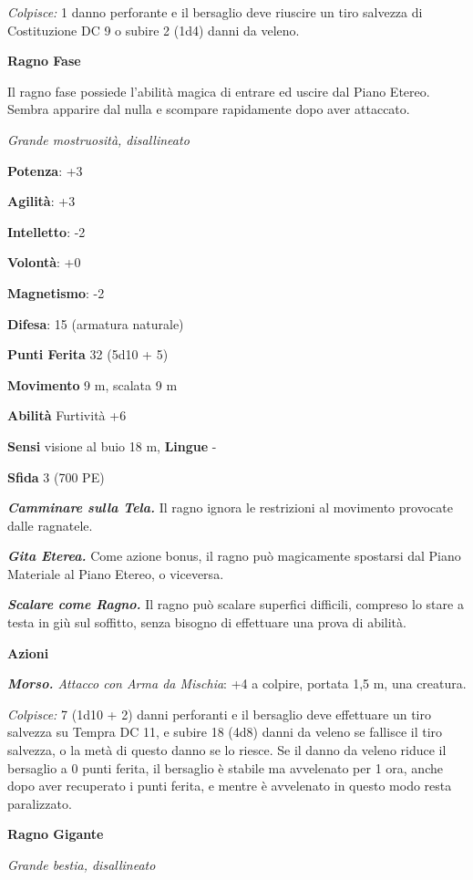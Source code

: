 \begin{multicols}{2}
\emph{Colpisce:} 1 danno perforante e il bersaglio deve riuscire un tiro
salvezza di Costituzione DC 9 o subire 2 (1d4) danni da veleno.



\textbf{Ragno Fase}

Il ragno fase possiede l'abilità magica di entrare ed uscire dal Piano
Etereo. Sembra apparire dal nulla e scompare rapidamente dopo aver
attaccato.

\emph{Grande mostruosità, disallineato}

\textbf{Potenza}: +3

\textbf{Agilità}: +3

\textbf{Intelletto}: -2

\textbf{Volontà}: +0

\textbf{Magnetismo}: -2

\textbf{Difesa}: 15 (armatura naturale)

\textbf{Punti Ferita} 32 (5d10 + 5)

\textbf{Movimento} 9 m, scalata 9 m

\textbf{Abilità} Furtività +6

\textbf{Sensi} visione al buio 18 m, 
\textbf{Lingue} -

\textbf{Sfida} 3 (700 PE)

\emph{\textbf{Camminare sulla Tela.}} Il ragno ignora le restrizioni al
movimento provocate dalle ragnatele.

\emph{\textbf{Gita Eterea.}} Come azione bonus, il ragno può magicamente
spostarsi dal Piano Materiale al Piano Etereo, o viceversa.

\emph{\textbf{Scalare come Ragno.}} Il ragno può scalare superfici
difficili, compreso lo stare a testa in giù sul soffitto, senza bisogno
di effettuare una prova di abilità.

\textbf{Azioni}

\emph{\textbf{Morso.} Attacco con Arma da Mischia}: +4 a colpire,
portata 1,5 m, una creatura.

\emph{Colpisce:} 7 (1d10 + 2) danni perforanti e il bersaglio deve
effettuare un tiro salvezza su Tempra DC 11, e subire 18 (4d8)
danni da veleno se fallisce il tiro salvezza, o la metà di questo danno
se lo riesce. Se il danno da veleno riduce il bersaglio a 0 punti
ferita, il bersaglio è stabile ma avvelenato per 1 ora, anche dopo aver
recuperato i punti ferita, e mentre è avvelenato in questo modo resta
paralizzato.

\textbf{Ragno Gigante}

\emph{Grande bestia, disallineato}


\end{multicols}
